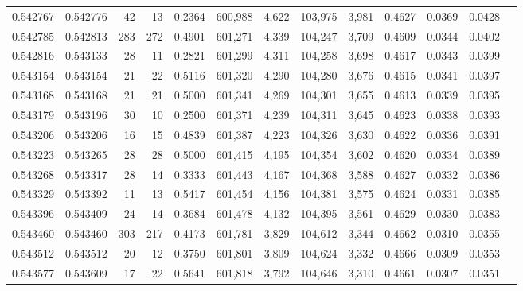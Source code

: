 \begin{tabular}{rrrrrrrrrrrrr}
0.542767 & 0.542776 &    42 &    13 &                                     0.2364 & 600,988 &   4,622 & 103,975 &   3,981 & 0.4627 & 0.0369 & 0.0428 \\
0.542785 & 0.542813 &   283 &   272 &                                     0.4901 & 601,271 &   4,339 & 104,247 &   3,709 & 0.4609 & 0.0344 & 0.0402 \\
0.542816 & 0.543133 &    28 &    11 &                                     0.2821 & 601,299 &   4,311 & 104,258 &   3,698 & 0.4617 & 0.0343 & 0.0399 \\
0.543154 & 0.543154 &    21 &    22 &                                     0.5116 & 601,320 &   4,290 & 104,280 &   3,676 & 0.4615 & 0.0341 & 0.0397 \\
0.543168 & 0.543168 &    21 &    21 &                                     0.5000 & 601,341 &   4,269 & 104,301 &   3,655 & 0.4613 & 0.0339 & 0.0395 \\
0.543179 & 0.543196 &    30 &    10 &                                     0.2500 & 601,371 &   4,239 & 104,311 &   3,645 & 0.4623 & 0.0338 & 0.0393 \\
0.543206 & 0.543206 &    16 &    15 &                                     0.4839 & 601,387 &   4,223 & 104,326 &   3,630 & 0.4622 & 0.0336 & 0.0391 \\
0.543223 & 0.543265 &    28 &    28 &                                     0.5000 & 601,415 &   4,195 & 104,354 &   3,602 & 0.4620 & 0.0334 & 0.0389 \\
0.543268 & 0.543317 &    28 &    14 &                                     0.3333 & 601,443 &   4,167 & 104,368 &   3,588 & 0.4627 & 0.0332 & 0.0386 \\
0.543329 & 0.543392 &    11 &    13 &                                     0.5417 & 601,454 &   4,156 & 104,381 &   3,575 & 0.4624 & 0.0331 & 0.0385 \\
0.543396 & 0.543409 &    24 &    14 &                                     0.3684 & 601,478 &   4,132 & 104,395 &   3,561 & 0.4629 & 0.0330 & 0.0383 \\
0.543460 & 0.543460 &   303 &   217 &                                     0.4173 & 601,781 &   3,829 & 104,612 &   3,344 & 0.4662 & 0.0310 & 0.0355 \\
0.543512 & 0.543512 &    20 &    12 &                                     0.3750 & 601,801 &   3,809 & 104,624 &   3,332 & 0.4666 & 0.0309 & 0.0353 \\
0.543577 & 0.543609 &    17 &    22 &                                     0.5641 & 601,818 &   3,792 & 104,646 &   3,310 & 0.4661 & 0.0307 & 0.0351 \\

\end{tabular}
